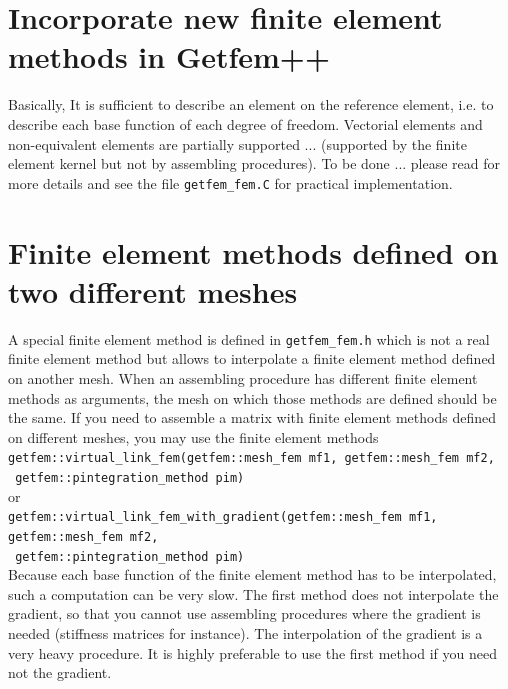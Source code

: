 \documentclass[11pt,a4paper]{article}
\begin{document}
\section{Incorporate new finite element methods in {\sc Getfem++}}

Basically, It is sufficient to describe an element on the reference element, i.e. to describe each base function of each degree of freedom. Vectorial elements and non-equivalent elements are partially supported ... (supported by the finite element kernel but not by assembling procedures). To be done ... please read \cite{BASCOMP} for more details and see the file {\tt getfem\_fem.C} for practical implementation.

\section{Finite element methods defined on two different meshes}

A special finite element method is defined in {\tt getfem\_fem.h} which is not a real finite element method but allows to interpolate a finite element method defined on another mesh. When an assembling procedure has different finite element methods as arguments, the mesh on which those methods are defined should be the same. If you need to assemble a matrix with finite element methods defined on different meshes, you may use the finite element methods\\[0.5cm]
{\tt getfem::virtual\_link\_fem(getfem::mesh\_fem mf1, getfem::mesh\_fem mf2,} \\ {\tt \mbox{}\hspace{12em} getfem::pintegration\_method pim) }\\[0.2cm]
or\\[0.2cm]
{\tt getfem::virtual\_link\_fem\_with\_gradient(getfem::mesh\_fem mf1, getfem::mesh\_fem mf2,} \\ {\tt \mbox{}\hspace{12em} getfem::pintegration\_method pim) }\\[0.5cm]
Because each base function of the finite element method has to be interpolated, such a computation can be very slow. The first method does not interpolate the gradient, so that you cannot use assembling procedures where the gradient is needed (stiffness matrices for instance). The interpolation of the gradient is a very heavy procedure. It is highly preferable to use the first method if you need not the gradient.\\[0.5cm]
\end{document}

